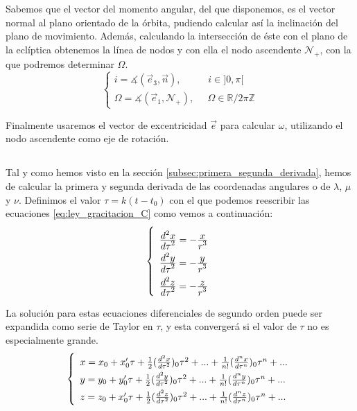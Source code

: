 \documentclass[11pt]{article}
\newcommand\ddfrac[2]{\frac{\displaystyle #1}{\displaystyle #2}}
\begin{document}
Sabemos que el vector del momento angular, del que disponemos, es el vector normal al plano orientado de la órbita, pudiendo calcular así la inclinación del plano de movimiento. Además, calculando la intersección de éste con el plano de la eclíptica obtenemos la línea de nodos y con ella el nodo ascendente $\mathcal{N}_+$, con la que podremos determinar $\Omega$.
\[
\left\{
\begin{array}{l}
	i=\measuredangle(\vec{e}_3,\vec{n}), \; \; \; \; \; \; \; \; \; \; i\in]0,\pi[\\
	\Omega=\measuredangle(\vec{e}_1, \mathcal{N}_+), \; \; \; \; \; \Omega\in\mathbb{R}/2\pi\mathbb{Z}
\end{array}
\right.
\]

Finalmente usaremos el vector de excentricidad $\vec{e}$ para calcular $\omega$, utilizando el nodo ascendente como eje de rotación.\\

\subsection{}
\label{subsec:series_potencias}
Tal y como hemos visto en la sección \ref{subsec:primera_segunda_derivada}, hemos de calcular la primera y segunda derivada de las coordenadas angulares o de $\lambda$, $\mu$ y $\nu$. Definimos el valor $\tau=k(t-t_0)$ con el que podemos reescribir las ecuaciones \eqref{eq:ley_gracitacion_C} como vemos a continuación:
\begin{align}
\left\{
\def\arraystretch{2}
\begin{array}{l}
	\ddfrac{d^2x}{d\tau^2}=-\ddfrac{x}{r^3}\\
	\ddfrac{d^2y}{d\tau^2}=-\ddfrac{y}{r^3}\\
	\ddfrac{d^2z}{d\tau^2}=-\ddfrac{z}{r^3}
\end{array}
\right.
\label{eq:ley_gravitacion_C_2}
\end{align}

La solución para estas ecuaciones diferenciales de segundo orden puede ser expandida como serie de Taylor en $\tau$, y esta convergerá si el valor de $\tau$ no es especialmente grande.
\begin{align}
\left\{
\def\arraystretch{1.5}
\begin{array}{l}
	x=x_0+x_0'\tau+\frac{1}{2}(\frac{d^2x}{d\tau^2})_0\tau^2+...+\frac{1}{n!}(\frac{d^nx}{d\tau^n})_0\tau^n+...\\
	y=y_0+y_0'\tau+\frac{1}{2}(\frac{d^2y}{d\tau^2})_0\tau^2+...+\frac{1}{n!}(\frac{d^ny}{d\tau^n})_0\tau^n+...\\
	z=z_0+x_0'\tau+\frac{1}{2}(\frac{d^2z}{d\tau^2})_0\tau^2+...+\frac{1}{n!}(\frac{d^nz}{d\tau^n})_0\tau^n+...\\	
\end{array}
\right.
\label{eq:series_taylor}
\end{align}
\end{document}
